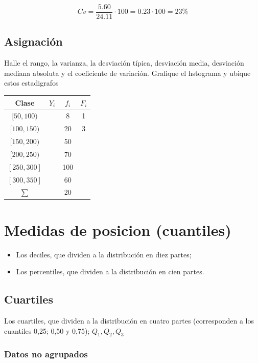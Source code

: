 \documentclass[
  11pt,
]{krantz}
\providecommand{\tightlist}{%
  \setlength{\itemsep}{0pt}\setlength{\parskip}{0pt}}
\theoremstyle{definition}
\theoremstyle{definition}
\theoremstyle{definition}
\theoremstyle{definition}
\theoremstyle{remark}
\begin{document}
\[Cv=\frac{5.60}{24.11}\cdot 100=0.23\cdot 100=23\%\]

\hypertarget{asignaciuxf3n-1}{%
\section{Asignación}\label{asignaciuxf3n-1}}

Halle el rango, la varianza, la desviación típica, desviación media, desviación mediana absoluta y el coeficiente de variación. Grafique el hstograma y ubique estos estadigrafos

\begin{longtable}[]{@{}cccc@{}}
\toprule
Clase & \(Y_i\) & \(f_i\) & \(F_i\) \\
\midrule
\endhead
\([50,100)\) & & 8 & 1 \\
\([100,150)\) & & 20 & 3 \\
\([150,200)\) & & 50 & \\
\([200,250)\) & & 70 & \\
\([250,300]\) & & 100 & \\
\([300,350]\) & & 60 & \\
\(\sum\) & & 20 & \\
\bottomrule
\end{longtable}

\hypertarget{medidas-de-posicion-cuantiles}{%
\chapter{Medidas de posicion (cuantiles)}\label{medidas-de-posicion-cuantiles}}

\begin{itemize}
\tightlist
\item
  Los deciles, que dividen a la distribución en diez partes;
\item
  Los percentiles, que dividen a la distribución en cien partes.
\end{itemize}

\hypertarget{cuartiles}{%
\section{Cuartiles}\label{cuartiles}}

Los cuartiles, que dividen a la distribución en cuatro partes (corresponden a los cuantiles 0,25; 0,50 y 0,75); \(Q_1, Q_2, Q_3\)

\hypertarget{datos-no-agrupados}{%
\subsection{Datos no agrupados}\label{datos-no-agrupados}}
\end{document}
